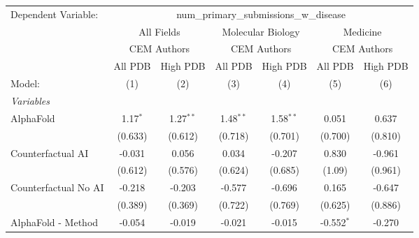 \begingroup
\centering
\begin{tabular}{lcccccc}
   \tabularnewline \midrule \midrule
   Dependent Variable: & \multicolumn{6}{c}{num\_primary\_submissions\_w\_disease}\\
 & \multicolumn{2}{c}{All Fields} & \multicolumn{2}{c}{Molecular Biology} & \multicolumn{2}{c}{Medicine} \\
\cmidrule(lr){2-3} \cmidrule(lr){4-5} \cmidrule(lr){6-7}
 & \multicolumn{2}{c}{CEM Authors} & \multicolumn{2}{c}{CEM Authors} & \multicolumn{2}{c}{CEM Authors} \\
\cmidrule(lr){2-3} \cmidrule(lr){4-5} \cmidrule(lr){6-7}
 & \multicolumn{1}{c}{All PDB} & \multicolumn{1}{c}{High PDB} & \multicolumn{1}{c}{All PDB} & \multicolumn{1}{c}{High PDB} & \multicolumn{1}{c}{All PDB} & \multicolumn{1}{c}{High PDB} \\
\cmidrule(lr){2-2} \cmidrule(lr){3-3} \cmidrule(lr){4-4} \cmidrule(lr){5-5} \cmidrule(lr){6-6} \cmidrule(lr){7-7}
   Model:                                                     & (1)           & (2)           & (3)           & (4)           & (5)           & (6)\\  
   \midrule
   \emph{Variables}\\
   AlphaFold                                                  & 1.17$^{*}$    & 1.27$^{**}$   & 1.48$^{**}$   & 1.58$^{**}$   & 0.051         & 0.637\\   
                                                              & (0.633)       & (0.612)       & (0.718)       & (0.701)       & (0.700)       & (0.810)\\   
   Counterfactual AI                                          & -0.031        & 0.056         & 0.034         & -0.207        & 0.830         & -0.961\\   
                                                              & (0.612)       & (0.576)       & (0.624)       & (0.685)       & (1.09)        & (0.961)\\   
   Counterfactual No AI                                       & -0.218        & -0.203        & -0.577        & -0.696        & 0.165         & -0.647\\   
                                                              & (0.389)       & (0.369)       & (0.722)       & (0.769)       & (0.625)       & (0.886)\\   
   AlphaFold - Method                                         & -0.054        & -0.019        & -0.021        & -0.015        & -0.552$^{*}$  & -0.270\\   

\end{tabular}
